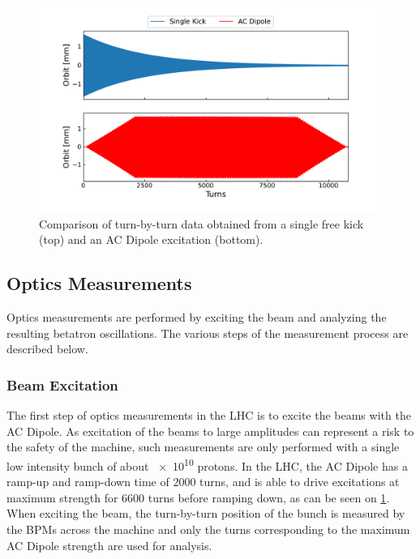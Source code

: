 \begin{figure}[!htb]
  \centering
  \includegraphics*[width=0.99\linewidth]{Figures/Optics_Measurements_Corrections_at_LHC/kick_vs_acdipole.pdf}
  \caption{Comparison of turn-by-turn data obtained from a single free kick (top) and an AC Dipole excitation (bottom).}
  \label{figure:kick_vs_acdipole_tbt}
\end{figure}

\subsection{Optics Measurements}
\label{subsection:optics_measurements}

Optics measurements are performed by exciting the beam and analyzing the resulting betatron oscillations.
The various steps of the measurement process are described below.

\subsubsection*{Beam Excitation}

The first step of optics measurements in the LHC is to excite the beams with the AC Dipole.
As excitation of the beams to large amplitudes can represent a risk to the safety of the machine, such measurements are only performed with a single low intensity bunch of about \num{e10} protons.
In the LHC, the AC Dipole has a ramp-up and ramp-down time of \num{2000} turns, and is able to drive excitations at maximum strength for \num{6600} turns before ramping down, as can be seen on \cref{figure:kick_vs_acdipole_tbt}.
When exciting the beam, the turn-by-turn position of the bunch is measured by the BPMs across the machine and only the turns corresponding to the maximum AC Dipole strength are used for analysis.

